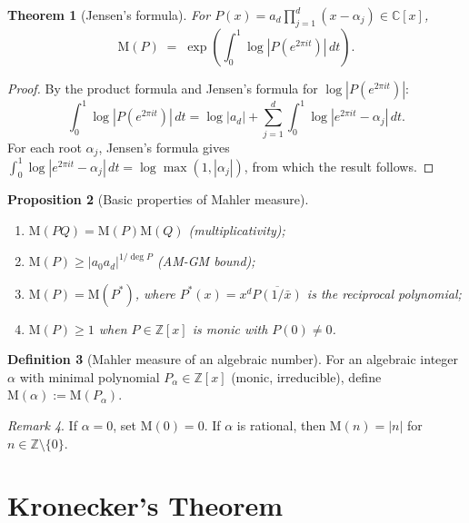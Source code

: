 \documentclass[12pt,a4paper]{amsart}
\newtheorem{theorem}{Theorem}[section]
\newtheorem{proposition}[theorem]{Proposition}
\theoremstyle{definition}
\newtheorem{definition}[theorem]{Definition}
\theoremstyle{remark}
\newtheorem{remark}[theorem]{Remark}
\newcommand{\Z}{\mathbb{Z}}
\newcommand{\C}{\mathbb{C}}
\newcommand{\M}{\mathrm{M}}
\begin{document}
\begin{theorem}[Jensen's formula]
  For $P(x) = a_d \prod_{j=1}^d (x - \alpha_j) \in \C[x]$,
  \[
    \M(P) \;=\; \exp\!\left(\int_0^1 \log|P(e^{2\pi i t})|\,dt\right).
  \]
\end{theorem}

\begin{proof}
  By the product formula and Jensen's formula for $\log|P(e^{2\pi it})|$:
  \[
    \int_0^1 \log|P(e^{2\pi it})|\,dt
    = \log|a_d| + \sum_{j=1}^d \int_0^1 \log|e^{2\pi it} - \alpha_j|\,dt.
  \]
  For each root $\alpha_j$, Jensen's formula gives
  $\int_0^1 \log|e^{2\pi it} - \alpha_j|\,dt = \log\max(1, |\alpha_j|)$,
  from which the result follows.
\end{proof}

\begin{proposition}[Basic properties of Mahler measure]
  \begin{enumerate}[label=(\roman*)]
    \item $\M(PQ) = \M(P)\M(Q)$ (multiplicativity);
    \item $\M(P) \geq |a_0 a_d|^{1/\deg P}$ (AM-GM bound);
    \item $\M(P) = \M(P^\ast)$, where $P^\ast(x) = x^d \overline{P(1/\bar{x})}$
      is the reciprocal polynomial;
    \item $\M(P) \geq 1$ when $P \in \Z[x]$ is monic with $P(0) \neq 0$.
  \end{enumerate}
\end{proposition}

\begin{definition}[Mahler measure of an algebraic number]
  For an algebraic integer $\alpha$ with minimal polynomial $P_\alpha \in \Z[x]$
  (monic, irreducible), define $\M(\alpha) := \M(P_\alpha)$.
\end{definition}

\begin{remark}
  If $\alpha = 0$, set $\M(0) = 0$. If $\alpha$ is rational, then
  $\M(n) = |n|$ for $n \in \Z\setminus\{0\}$.
\end{remark}

\section{Kronecker's Theorem}\label{sec:kronecker}
\end{document}
